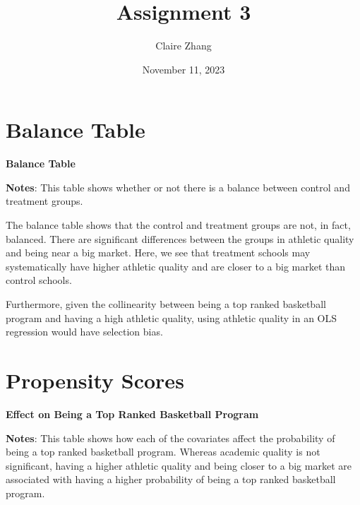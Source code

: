 \documentclass{article}
\title{Assignment 3}
\author{Claire Zhang}
\date{November 11, 2023}
\begin{document}
\maketitle

\section{Balance Table}

\begin{table}[htbp]
\caption{\textbf{Balance Table}
\label{tab:EngApproach}}
\center
	
    \center
    \begin{footnotesize}
    \textbf{Notes}: This table shows whether or not there is a balance between control and treatment groups.  
    \end{footnotesize}
\end{table}

The balance table shows that the control and treatment groups are not, in fact, balanced. There are significant differences between the groups in athletic quality and being near a big market. Here, we see that treatment schools may systematically have higher athletic quality and are closer to a big market than control schools.

Furthermore, given the collinearity between being a top ranked basketball program and having a high athletic quality, using athletic quality in an OLS regression would have selection bias.

\newpage

\section{Propensity Scores}
\begin{table}[htbp]
\caption{\textbf{Effect on Being a Top Ranked Basketball Program}
\label{tab:EngApproach}}
\center
	
    \center
    \begin{footnotesize}
    \textbf{Notes}: This table shows how each of the covariates affect the probability of being a top ranked basketball program. Whereas academic quality is not significant, having a higher athletic quality and being closer to a big market are associated with having a higher probability of being a top ranked basketball program.
    \end{footnotesize}
\end{table}
\newpage
\end{document}
